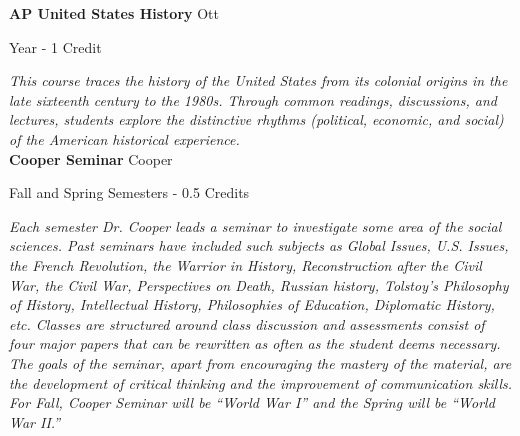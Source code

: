 \noindent\textbf{AP United States History} \hfill Ott

\noindent Year - 1 Credit

\vspace{1mm}\emph{This course traces the history of the United States from its colonial origins in the late sixteenth century to the 1980s. Through common readings, discussions, and lectures, students explore the distinctive rhythms (political, economic, and social) of the American historical experience. }\\

%
%

%
%

\noindent\textbf{Cooper Seminar} \hfill Cooper

\noindent Fall and Spring Semesters - 0.5 Credits

\vspace{1mm}\emph{Each semester Dr. Cooper leads a seminar to investigate some area of the social sciences. Past seminars have included such subjects as Global Issues, U.S. Issues, the French Revolution, the Warrior in History, Reconstruction after the Civil War, the Civil War, Perspectives on Death, Russian history, Tolstoy’s Philosophy of History, Intellectual History, Philosophies of Education, Diplomatic History, etc. Classes are structured around class discussion and assessments consist of four major papers that can be rewritten as often as the student deems necessary. The goals of the seminar, apart from encouraging the mastery of the material, are the development of critical thinking and the improvement of communication skills.  For Fall, Cooper Seminar will be ``World War I'' and the Spring will be ``World War II.''}\\

